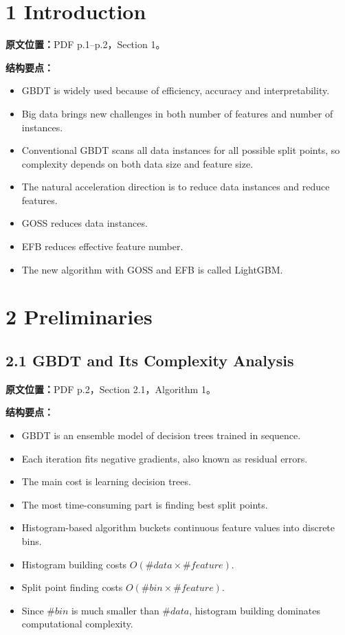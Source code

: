 \section{1 Introduction}

\textbf{原文位置：}PDF p.1--p.2，Section 1。

\textbf{结构要点：}
\begin{itemize}
  \item GBDT is widely used because of efficiency, accuracy and interpretability.
  \item Big data brings new challenges in both number of features and number of instances.
  \item Conventional GBDT scans all data instances for all possible split points, so complexity depends on both data size and feature size.
  \item The natural acceleration direction is to reduce data instances and reduce features.
  \item GOSS reduces data instances.
  \item EFB reduces effective feature number.
  \item The new algorithm with GOSS and EFB is called LightGBM.
\end{itemize}

\section{2 Preliminaries}

\subsection{2.1 GBDT and Its Complexity Analysis}

\textbf{原文位置：}PDF p.2，Section 2.1，Algorithm 1。

\textbf{结构要点：}
\begin{itemize}
  \item GBDT is an ensemble model of decision trees trained in sequence.
  \item Each iteration fits negative gradients, also known as residual errors.
  \item The main cost is learning decision trees.
  \item The most time-consuming part is finding best split points.
  \item Histogram-based algorithm buckets continuous feature values into discrete bins.
  \item Histogram building costs $O(\#data\times \#feature)$.
  \item Split point finding costs $O(\#bin\times \#feature)$.
  \item Since $\#bin$ is much smaller than $\#data$, histogram building dominates computational complexity.
\end{itemize}

